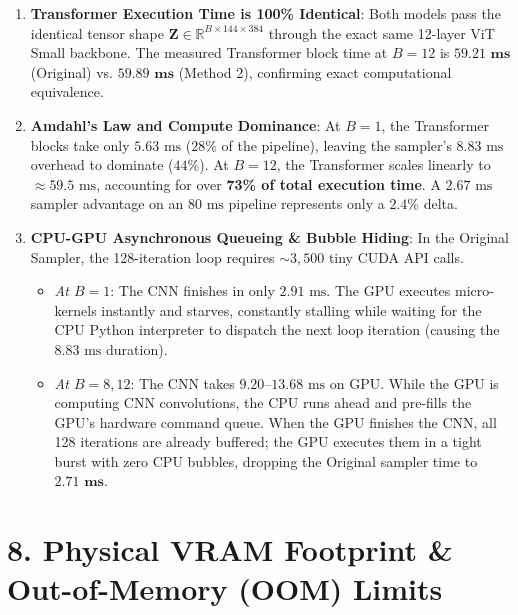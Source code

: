 \documentclass[11pt,a4paper]{article}
\begin{document}
\begin{tcolorbox}[colback=lightbg,colframe=cardborder,arc=2mm,boxrule=0.8pt]
\begin{enumerate}[leftmargin=*,itemsep=4pt]
    \item \textbf{Transformer Execution Time is 100\% Identical}:
    Both models pass the identical tensor shape $\mathbf{Z} \in \mathbb{R}^{B \times 144 \times 384}$ through the exact same 12-layer ViT Small backbone. The measured Transformer block time at $B=12$ is $\mathbf{59.21\text{ ms}}$ (Original) vs. $\mathbf{59.89\text{ ms}}$ (Method 2), confirming exact computational equivalence.
    
    \item \textbf{Amdahl's Law and Compute Dominance}:
    At $B=1$, the Transformer blocks take only $5.63\text{ ms}$ ($28\%$ of the pipeline), leaving the sampler's $8.83\text{ ms}$ overhead to dominate ($44\%$). At $B=12$, the Transformer scales linearly to $\approx 59.5\text{ ms}$, accounting for over \textbf{73\% of total execution time}. A $2.67\text{ ms}$ sampler advantage on an $80\text{ ms}$ pipeline represents only a $2.4\%$ delta.
    
    \item \textbf{CPU-GPU Asynchronous Queueing \& Bubble Hiding}:
    In the Original Sampler, the 128-iteration loop requires $\sim 3,500$ tiny CUDA API calls.
    \begin{itemize}[leftmargin=*,itemsep=2pt]
        \item \textit{At $B=1$}: The CNN finishes in only $2.91\text{ ms}$. The GPU executes micro-kernels instantly and starves, constantly stalling while waiting for the CPU Python interpreter to dispatch the next loop iteration (causing the $8.83\text{ ms}$ duration).
        \item \textit{At $B=8, 12$}: The CNN takes $9.20\text{--}13.68\text{ ms}$ on GPU. While the GPU is computing CNN convolutions, the CPU runs ahead and pre-fills the GPU's hardware command queue. When the GPU finishes the CNN, all 128 iterations are already buffered; the GPU executes them in a tight burst with zero CPU bubbles, dropping the Original sampler time to $\mathbf{2.71\text{ ms}}$.
    \end{itemize}
\end{enumerate}
\end{tcolorbox}

\vspace{0.4em}

\section*{8. Physical VRAM Footprint \& Out-of-Memory (OOM) Limits}
\end{document}
